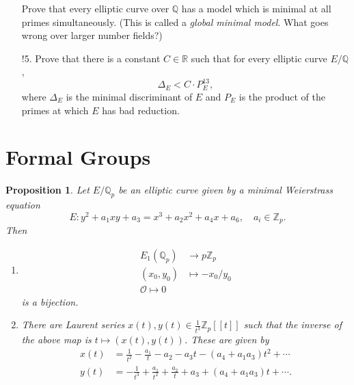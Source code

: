 \documentclass[a4paper]{article}
\newtheorem{proposition}[theorem]{Proposition}
\theoremstyle{definition}
\newcommand{\series}[2]{#1[\![#2]\!]}
\renewcommand{\O}{\mathcal{O}}
\newcommand{\Z}{\mathbb{Z}}
\newcommand{\Q}{\mathbb{Q}}
\newcommand{\R}{\mathbb{R}}
\begin{document}
\begin{enumerate}
        Prove that every elliptic curve over $\Q$ has a model which is minimal
        at all primes simultaneously. (This is called a \emph{global minimal
        model}. What goes wrong over larger number fields?)

    \item[!5.] Prove that there is a constant $C\in\R$ such that for every
        elliptic curve $E/\Q$,
        \begin{equation*}
            \Delta_E<C\cdot P_E^{13},
        \end{equation*}
        where $\Delta_E$ is the minimal discriminant of $E$ and $P_E$ is the
        product of the primes at which $E$ has bad reduction.
\end{enumerate}

\section{Formal Groups}

\begin{proposition}
    Let $E/\Q_p$ be an elliptic curve given by a minimal Weierstrass equation
    \begin{equation*}
        E:y^2+a_1xy+a_3=x^3+a_2x^2+a_4x+a_6,\quad a_i\in\Z_p.
    \end{equation*}
    Then
    \begin{enumerate}[label=(\roman*)]
        \item
            \begin{align*}
                E_1(\Q_p)&\to p\Z_p \\
                (x_0,y_0)&\mapsto -x_0/y_0 \\
                \O\mapsto0
            \end{align*}
            is a bijection.

    \item There are Laurent series $x(t),y(t)\in\frac{1}{t^3}\series{\Z_p}{t}$
        such that the inverse of the above map is $t\mapsto(x(t),y(t))$. These
        are given by
        \begin{align*}
            x(t) &= \frac{1}{t^2} - \frac{a_1}{t} - a_2 - a_3t - (a_4+a_1a_3)t^2
                + \cdots \\
            y(t) &= -\frac{1}{t^3} + \frac{a_1}{t^2} + \frac{a_2}{t} + a_3
                + (a_4+a_1a_3)t + \cdots.
        \end{align*}
    \end{enumerate}
\end{proposition}
\end{document}
